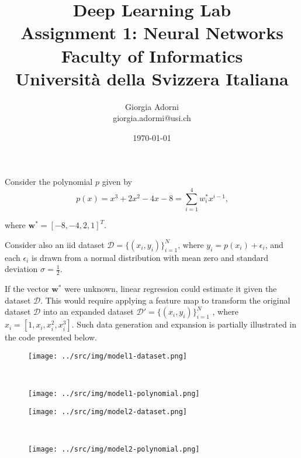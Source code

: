 \documentclass[12pt]{article}
\title{Deep Learning Lab \\ \Large{Assignment 1: Neural Networks} \\[0.3em] \normalsize{Faculty of Informatics} \\ \normalsize{Università della Svizzera Italiana}}
\author {{Giorgia Adorni}	\\ \normalsize{giorgia.adormi@usi.ch}}
\date{\today}
\begin{document}
 
	
	
	\maketitle 
	
	Consider the polynomial $p$ given by
	\begin{equation*}
	 p(x)=x^3+2x^2-4x-8=\sum_{i=1}^4 w_i^*x^{i-1} \mbox{,}
	\end{equation*} 
	
	where $\textbf{w}^*=[-8,-4,2,1]^T$.
	
	Consider also an iid dataset $\mathcal{D} = \{(x_i, y_i)\}^N_{i=1}$, where $y_i = p(x_i)+\epsilon_i$, and each $\epsilon_i$ is drawn from a normal distribution with mean zero and standard deviation $\sigma = \frac{1}{2}$.
	
	If the vector $\textbf{w}^*$ were unknown, linear regression could estimate it given the dataset $\mathcal{D}$. This would require applying a feature map to transform the
	original dataset $\mathcal{D}$ into an expanded dataset $\mathcal{D}'= \{(x_i, y_i)\}^N_{i=1}$ , where $x_i = [1,x_i,x_i^2,x_i^3]$.
	Such data generation and expansion is partially illustrated in the code presented below.
	
	
	\begin{figure}
		\begin{minipage}[c]{.5\textwidth}
		\centering
		\texttt{[image: ../src/img/model1-dataset.png]}
		\label{fig:model1-dataset}
		\end{minipage}
		~
		\begin{minipage}[c]{.5\textwidth}
			\centering
			\texttt{[image: ../src/img/model1-polynomial.png]}
			\label{fig:model1-polynomial}
		\end{minipage}
	\end{figure}

		\begin{figure}
		\begin{minipage}[c]{.5\textwidth}
			\centering
			\texttt{[image: ../src/img/model2-dataset.png]}
			\label{fig:model2-dataset}
		\end{minipage}
		~
		\begin{minipage}[c]{.5\textwidth}
			\centering
			\texttt{[image: ../src/img/model2-polynomial.png]}
			\label{fig:model2-polynomial}
		\end{minipage}
	\end{figure}
\end{document}
